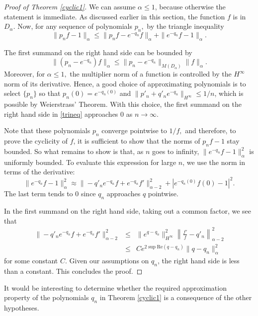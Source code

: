 \documentclass[11 pt,reqno]{amsart}
\theoremstyle{definition}
\theoremstyle{remark}
\numberwithin{equation}{section} \numberwithin{figure}{section}
\begin{document}
\begin{proof}[Proof of Theorem \ref{cyclic1}]
We can assume $\alpha \leq 1$, because otherwise the statement is
immediate. As discussed earlier in this section, the
function $f$ is in $D_\alpha$. Now, for any sequence of polynomials $p_n,$
by the triangle inequality
\begin{equation}
\|p_n f -1\|_\alpha \leq \|p_n f - e^{-q_n}f\|_\alpha +
\|e^{-q_n} f -1\|_\alpha. \label{trineq}
\end{equation}

The first summand on the right hand side can be bounded by
$$\|(p_n-e^{-q_n})f\|_\alpha \leq \|p_n -
e^{-q_n}\|_{M(D_{\alpha})} \|f\|_\alpha.$$
Moreover, for $\alpha \leq 1,$ the multiplier norm of a
function is controlled by the $H^\infty$ norm of its derivative.
Hence, a good choice of approximating polynomials is to select $\{p_n\}$ so
that $p_n(0)=e^{-q_n(0)}$ and $\|p'_n + q'_n e^{-q_n}\|_{H^\infty} \leq
1/n$, which is possible by Weierstrass' Theorem. With this choice, the first summand on
the right hand side in
\eqref{trineq} approaches $0$ as $n \rightarrow \infty$.

Note that these  polynomials
$p_n$ converge pointwise to $1/f,$ and therefore, to prove the
cyclicity of $f$, it is sufficient to show that the norms of $p_n f-1$  stay bounded.
So what remains to show is that, as $n$ goes to infinity,
$\|e^{-q_n}f-1\|^2_\alpha $ is uniformly bounded. To evaluate this
expression for large $n$, we use the norm in terms of the
derivative:
$$\|e^{-q_n}f-1\|^2_\alpha \approx \|-q'_n e^{-q_n}f + e^{-q_n}f'\|^2_{\alpha-2} + |e^{-q_n(0)}f(0)-1|^2. $$
The last term tends to $0$ since
$q_n$ approaches $q$ pointwise.

In the first summand on the right hand side, taking out a common factor, we
see that
\begin{eqnarray*}
\|-q'_n e^{-q_n}f + e^{-q_n}f'\|^2_{\alpha-2} & \leq &
\|e^{q-q_n}\|^2_{H^{\infty}} \left\|\frac{f'}{f} -
q'_n\right\|^2_{\alpha-2} \\
& \leq &  C e^{2\sup \mathrm{Re}(q-q_n)} \|q - q_n\|^2_{\alpha}
\end{eqnarray*}
for some constant $C$.
Given our assumptions on $q_n$, the right hand side is less than a constant.
This concludes the proof.

\end{proof}

It would be interesting to determine whether the required approximation property of the polynomials $q_n$ in Theorem \ref{cyclic1} is a consequence of
the other hypotheses.
\end{document}
